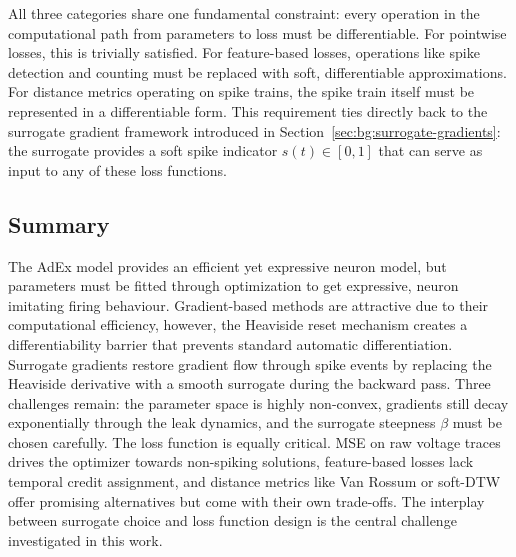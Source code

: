 All three categories share one fundamental constraint: every operation in the computational path from parameters to loss must be differentiable.
For pointwise losses, this is trivially satisfied.
For feature-based losses, operations like spike detection and counting must be replaced with soft, differentiable approximations.
For distance metrics operating on spike trains, the spike train itself must be represented in a differentiable form.
This requirement ties directly back to the surrogate gradient framework introduced in Section~\ref{sec:bg:surrogate-gradients}:
the surrogate provides a soft spike indicator $s(t) \in [0, 1]$ that can serve as input to any of these loss functions.

\subsection{Summary}\label{sec:bg:summary}
The AdEx model provides an efficient yet expressive neuron model, but parameters must be fitted through optimization to get expressive, neuron imitating firing behaviour.
Gradient-based methods are attractive due to their computational efficiency, however, the Heaviside reset mechanism creates a differentiability barrier that prevents standard automatic differentiation.
Surrogate gradients restore gradient flow through spike events by replacing the Heaviside derivative with a smooth surrogate during the backward pass.
Three challenges remain: the parameter space is highly non-convex, gradients still decay exponentially through the leak dynamics, and the surrogate steepness $\beta$ must be chosen carefully.
The loss function is equally critical.
MSE on raw voltage traces drives the optimizer towards non-spiking solutions, feature-based losses lack temporal credit assignment, and distance metrics like Van Rossum or soft-DTW offer promising alternatives but come with their own trade-offs.
The interplay between surrogate choice and loss function design is the central challenge investigated in this work.
